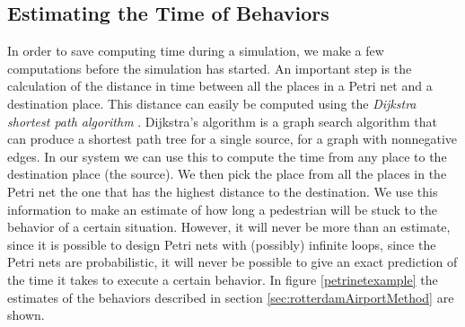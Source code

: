 \documentclass[11pt, a4paper]{book}
\begin{document}
\subsection{Estimating the Time of Behaviors}
In order to save computing time during a simulation, we make a few computations before the simulation has started. An important step is the calculation of the distance in time between all the places in a Petri net and a destination place. This distance can easily be computed using the \emph{Dijkstra shortest path algorithm} \cite{dijkstra}. Dijkstra's algorithm is a graph search algorithm that can produce a shortest path tree for a single source, for a graph with nonnegative edges. In our system we can use this to compute the time from any place to the destination place (the source). We then pick the place from all the places in the Petri net the one that has the highest distance to the destination. We use this information to make an estimate of how long a pedestrian will be stuck to the behavior of a certain situation. However, it will never be more than an estimate, since it is possible to design Petri nets with (possibly) infinite loops, since the Petri nets are probabilistic, it will never be possible to give an exact prediction of the time it takes to execute a certain behavior. In figure \ref{petrinetexample} the estimates of the behaviors described in section \ref{sec:rotterdamAirportMethod} are shown.
\end{document}
